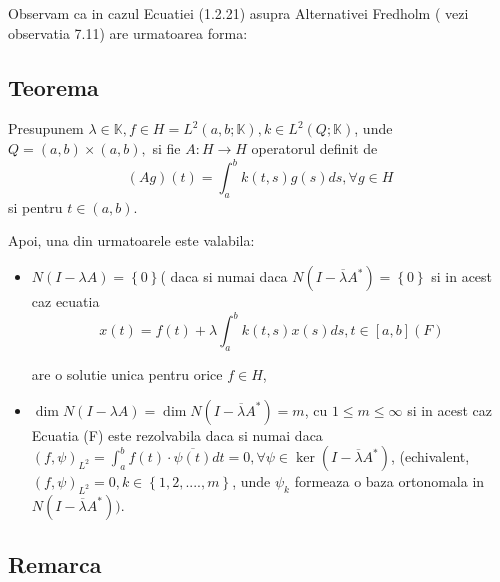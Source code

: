 \documentclass[a4paper,12pt,oneside]{report}
\begin{document}
	Observam ca in cazul Ecuatiei (1.2.21) asupra Alternativei Fredholm ( vezi observatia 7.11) are urmatoarea forma:
						
	\subsection{Teorema}
					
	Presupunem \(\lambda \in \mathbb{K}, f\in H = L^{2}\left (a,b;\mathbb{K} \right ), k\in L^{2}\left ( Q; \mathbb{K} \right )\), unde \(Q = \left ( a,b \right )\times \left ( a,b \right ),\) si fie \(A : H \rightarrow H\) operatorul definit de
	\begin{displaymath}
		\left (Ag  \right )\left ( t \right ) = \int_{a}^{b}k\left ( t,s \right )g\left ( s \right )ds, \forall g \in H
	\end{displaymath}
	si pentru \(t \in \left ( a,b \right )\). 
					
	Apoi, una din urmatoarele este valabila:
	\begin{itemize}
		\item \(N\left ( I - \lambda A \right ) = \left \{ 0 \right \}\)( daca si numai daca \(N\left ( I - \overline{\lambda} A^{\ast } \right ) = \left \{ 0 \right \}\) si in acest caz ecuatia  
		      \begin{displaymath}
		      	x\left ( t \right ) = f\left ( t \right ) + \lambda \int_{a}^{b}k\left ( t,s \right )x\left ( s \right )ds, t\in \left [ a,b \right ] (F)
		      \end{displaymath} 
		      		      		      		      		      
		      are o solutie unica pentru orice \(f\in H\), 
		\item \(\dim N\left ( I - \lambda A \right ) = \dim N\left ( I - \overline{\lambda} A^{\ast } \right ) = m\), cu \(1\leq m\leq \infty\) si in acest caz Ecuatia (F) este rezolvabila daca si numai daca \(\left ( f, \psi  \right )_{L^{2}} = \int_{a}^{b}f\left ( t \right )\cdot \overline{\psi \left ( t \right )}dt = 0, \forall \psi \in \ker \left ( I - \overline{\lambda}A^{\ast } \right )\),
		      (echivalent, \(\left ( f, \psi  \right )_{L^{2}} = 0, k\in \left \{ 1,2,....,m \right \}\), unde \(\psi _{k}\) formeaza o baza ortonomala in \(N\left ( I - \overline{\lambda}A^{\ast } \right ))\).
	\end{itemize}
					
	\subsection{Remarca}
					
\end{document}

